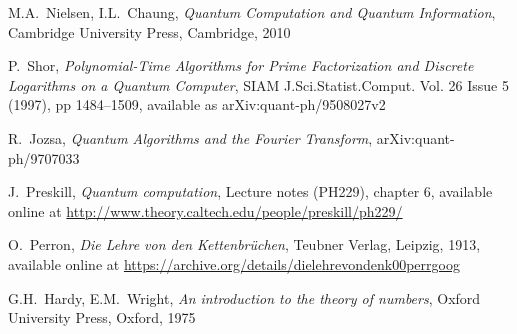\documentclass[a4paper, draft]{article}
\theoremstyle{own}
\theoremstyle{remark}
\begin{document}

\begin{thebibliography}{9}


M.A.~Nielsen, I.L.~Chaung, \emph{Quantum Computation and Quantum Information},
Cambridge University Press, Cambridge, 2010

P.~Shor, \emph{Polynomial-Time Algorithms for Prime Factorization and Discrete Logarithms on a Quantum Computer}, SIAM J.Sci.Statist.Comput. Vol. 26 Issue 5 (1997), pp 1484--1509, available as arXiv:quant-ph/9508027v2


R.~Jozsa, \emph{Quantum Algorithms and the Fourier Transform},  	arXiv:quant-ph/9707033

J.~Preskill, \emph{Quantum computation}, Lecture notes (PH229), chapter 6, available online at \url{http://www.theory.caltech.edu/people/preskill/ph229/}

O.~Perron, \emph{Die Lehre von den Kettenbr\"uchen}, Teubner Verlag, Leipzig, 1913, available online at \url{https://archive.org/details/dielehrevondenk00perrgoog}

G.H.~Hardy, E.M.~Wright, \emph{An introduction to the theory of numbers}, Oxford University Press, Oxford, 1975

\end{thebibliography}
\end{document}
